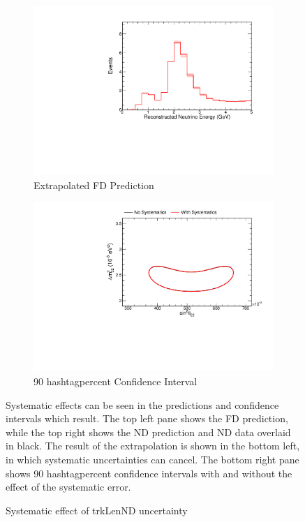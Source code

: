 {\begin{figure}
\begin{center}
\begin{subfigure}[c]{0.49\textwidth}
\includegraphics[width=\textwidth]{figures/systs/prediction/fd_extrap_prediction_trkLenND.pdf}
\caption*{Extrapolated FD Prediction}
\end{subfigure}
\begin{subfigure}[c]{0.49\textwidth}
\includegraphics[width=\textwidth]{figures/systs/prediction/fd_extrap_contour_trkLenND.pdf}
\caption*{90 hashtagpercent Confidence Interval}
\end{subfigure}
\end{center}
\caption{Systematic effect of trkLenND uncertainty}{
Systematic effects can be seen in the predictions and confidence intervals
which result.
The top left pane shows the FD prediction, while the top right shows the
ND prediction and ND data overlaid in black.
The result of the extrapolation is shown in the bottom left, in which
systematic uncertainties can cancel.
The bottom right pane shows 90 hashtagpercent confidence intervals with and without
the effect of the systematic error.}
\label{syst_fig_trkLenND}


\end{figure}}
